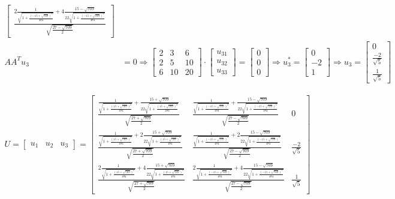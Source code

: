 \documentclass[a4paper, spanish]{article}
\begin{document}
\begin{align}
\begin{bmatrix}
      \frac{2\frac{1}{\sqrt{1 + \frac{(- 15 + \sqrt{709})^2}{484}}} +4
      \frac{15 - \sqrt{709}}{22\sqrt{1 + \frac{(- 15 + \sqrt{709})^2}{484}}}}{\sqrt{\frac{27 - \sqrt{709}}{2}}}
    \end{bmatrix} \\
    AA^T u_3 &= 0
    \Rightarrow
    \begin{bmatrix}
      2 & 3 & 6 \\
      2 & 5 & 10 \\
      6 & 10 & 20
    \end{bmatrix}
    \cdot
    \begin{bmatrix}
      u_{31} \\
      u_{32} \\
      u_{33}
    \end{bmatrix}
    =
    \begin{bmatrix}
      0 \\
      0 \\
      0
    \end{bmatrix}
    \Rightarrow
    u_3^* =
    \begin{bmatrix}
      0 \\
      -2 \\
      1
    \end{bmatrix}
    \Rightarrow
    u_3 =
    \begin{bmatrix}
      0 \\
      \frac{-2}{\sqrt{5}} \\
      \frac{1}{\sqrt{5}}
    \end{bmatrix}
  \end{align}

  \begin{align}
    U =
    \begin{bmatrix}
      u_1 & u_2 & u_3
    \end{bmatrix} =
    \begin{bmatrix}
      \frac{\frac{1}{\sqrt{1 + \frac{(15 + \sqrt{709})^2}{484}}} +
      \frac{15 + \sqrt{709}}{22\sqrt{1 + \frac{(15 + \sqrt{709})^2}{484}}}}{\sqrt{\frac{27 + \sqrt{709}}{2}}} & \frac{\frac{1}{\sqrt{1 + \frac{(- 15 + \sqrt{709})^2}{484}}} + \frac{15 - \sqrt{709}}{22\sqrt{1 + \frac{(- 15 + \sqrt{709})^2}{484}}}}{\sqrt{\frac{27 - \sqrt{709}}{2}}} & 0 \\
      \frac{\frac{1}{\sqrt{1 + \frac{(15 + \sqrt{709})^2}{484}}} +2
      \frac{15 + \sqrt{709}}{22\sqrt{1 + \frac{(15 + \sqrt{709})^2}{484}}}}{\sqrt{\frac{27 + \sqrt{709}}{2}}} & \frac{\frac{1}{\sqrt{1 + \frac{(- 15 + \sqrt{709})^2}{484}}} + 2
      \frac{15 - \sqrt{709}}{22\sqrt{1 + \frac{(- 15 + \sqrt{709})^2}{484}}}}{\sqrt{\frac{27 - \sqrt{709}}{2}}} & \frac{-2}{\sqrt{5}} \\
      \frac{2\frac{1}{\sqrt{1 + \frac{(15 + \sqrt{709})^2}{484}}} +4
      \frac{15 + \sqrt{709}}{22\sqrt{1 + \frac{(15 + \sqrt{709})^2}{484}}}}{\sqrt{\frac{27 + \sqrt{709}}{2}}} & \frac{2\frac{1}{\sqrt{1 + \frac{(- 15 + \sqrt{709})^2}{484}}} +4
      \frac{15 - \sqrt{709}}{22\sqrt{1 + \frac{(- 15 + \sqrt{709})^2}{484}}}}{\sqrt{\frac{27 - \sqrt{709}}{2}}} & \frac{1}{\sqrt{5}}
    \end{bmatrix}
  \end{align}
\end{document}
